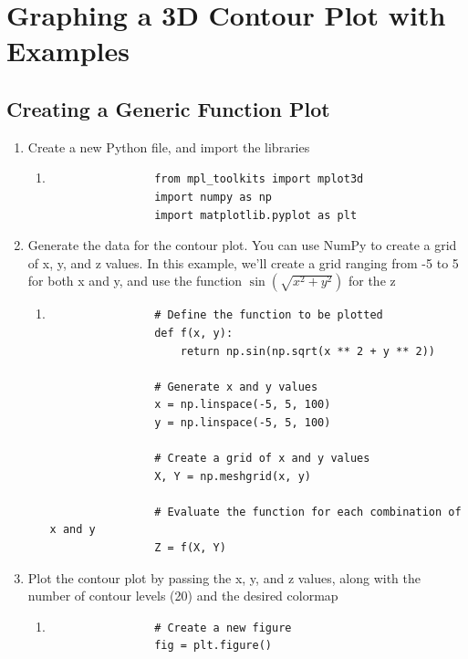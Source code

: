 \documentclass[
11pt, %
a4paper, %
oneside, %
headinclude,footinclude, %
BCOR5mm, %
]{scrartcl}
\begin{document}

\section{Graphing a 3D Contour Plot with Examples}

\subsection{Creating a Generic Function Plot}
	\begin{enumerate}
		\item Create a new Python file, and import the libraries
		\begin{enumerate}
			\item[] \begin{verbatim}
				from mpl_toolkits import mplot3d
				import numpy as np
				import matplotlib.pyplot as plt
			\end{verbatim}
		\end{enumerate}
		\item Generate the data for the contour plot. You can use NumPy to create a grid of x, y, and z values. In this example, we'll create a grid ranging from -5 to 5 for both x and y, and use the function $\sin(\sqrt{x^2 + y^2})$ for the z
		\begin{enumerate}
			\item[] \begin{verbatim}
				# Define the function to be plotted
				def f(x, y):
				    return np.sin(np.sqrt(x ** 2 + y ** 2))

				# Generate x and y values
				x = np.linspace(-5, 5, 100)
				y = np.linspace(-5, 5, 100)

				# Create a grid of x and y values
				X, Y = np.meshgrid(x, y)

				# Evaluate the function for each combination of x and y
				Z = f(X, Y)
			\end{verbatim}
		\end{enumerate}
		\item Plot the contour plot by passing the x, y, and z values, along with the number of contour levels (20) and the desired colormap
		\begin{enumerate}
			\item[] \begin{verbatim}
				# Create a new figure
				fig = plt.figure()


\end{verbatim}
\end{enumerate}
\end{enumerate}
\end{document}
